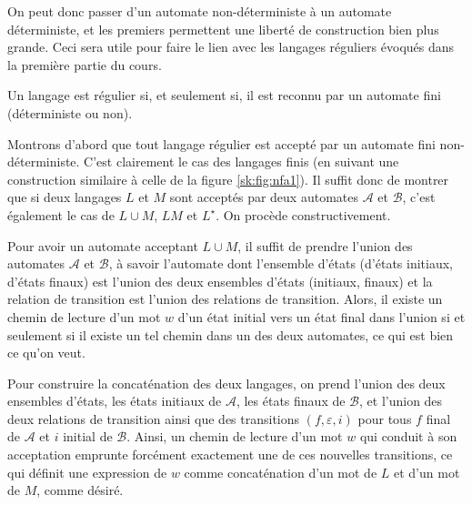 On peut donc passer d'un automate non-déterministe à un automate déterministe, et les premiers permettent une liberté de construction bien plus grande. Ceci sera utile pour faire le lien avec les langages réguliers évoqués dans la première partie du cours.

\begin{thm}[Kleene, 1951]
Un langage est régulier si, et seulement si, il est reconnu par un automate fini (déterministe ou non).
\end{thm}

\begin{preuve}
Montrons d'abord que tout langage régulier est accepté par un automate fini non-déterministe. C'est clairement le cas des langages finis (en suivant une construction similaire à celle de la figure \ref{sk:fig:nfa1}). Il suffit donc de montrer que si deux langages $L$ et $M$ sont acceptés par deux automates $\mathcal A$ et $\mathcal{B}$, c'est également le cas de $L\cup M$, $LM$ et $L^\star$. On procède constructivement.

Pour avoir un automate acceptant $L\cup M$, il suffit de prendre l'union des automates $\mathcal A$ et $\mathcal{B}$, à savoir l'automate dont l'ensemble d'états (d'états initiaux, d'états finaux) est l'union des deux ensembles d'états (initiaux, finaux) et la relation de transition est l'union des relations de transition. Alors, il existe un chemin de lecture d'un mot $w$ d'un état initial vers un état final dans l'union si et seulement si il existe un tel chemin dans un des deux automates, ce qui est bien ce qu'on veut.

Pour construire la concaténation des deux langages, on prend l'union des deux ensembles d'états, les états initiaux de $\mathcal A$, les états finaux de $\mathcal{B}$, et l'union des deux relations de transition ainsi que des transitions $(f, \varepsilon, i)$ pour tous $f$ final de $\mathcal A$ et $i$ initial de $\mathcal{B}$. Ainsi, un chemin de lecture d'un mot $w$ qui conduit à son acceptation emprunte forcément exactement une de ces nouvelles transitions, ce qui définit une expression de $w$ comme concaténation d'un mot de $L$ et d'un mot de $M$, comme désiré.


\end{preuve}
